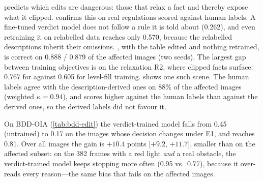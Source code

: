 \begin{table}[t]\centering\small
\caption{\textbf{Controlled edit on BDD-OIA} (independent labels). E1: traffic lights may be ignored; E2: other obstacles may be ignored. Accuracy over all 4,572 test images and on the images whose decision changes. Seed 1 replicates every row (, verdict-only 0.116, Direct-SFT 0.213 on the E1 affected images).}
\label{tab:bdd-edit}
\end{table}

 predicts which edits are dangerous: those that relax a fact and thereby expose what it clipped.  confirms this on real regulations scored against human labels. A fine-tuned verdict model does not follow a rule it is told about (0.262), and even retraining it on relabelled data reaches only 0.570, because the relabelled descriptions inherit their omissions. \lux, with the table edited and nothing retrained, is correct on 0.888 / 0.879 of the affected images (two seeds). The largest gap between training objectives is on the relaxation R2, where clipped facts surface: 0.767 for \lux against 0.605 for level-fill training.  shows one such scene. The human labels agree with the description-derived ones on 88\% of the affected images (weighted $\kappa=0.94$), and \lux scores higher against the human labels than against the derived ones, so the derived labels did not favour it.

On BDD-OIA (\cref{tab:bdd-edit}) the verdict-trained model falls from 0.45 (untrained) to 0.17 on the images whose decision changes under E1, and \lux reaches 0.81. Over all images the gain is $+10.4$ points [$+9.2$, $+11.7$], smaller than on the affected subset: on the 382 frames with a red light \emph{and} a real obstacle, the verdict-trained model keeps stopping more often (0.95 vs.\ 0.77), because it over-reads every reason---the same bias that fails on the affected images.

